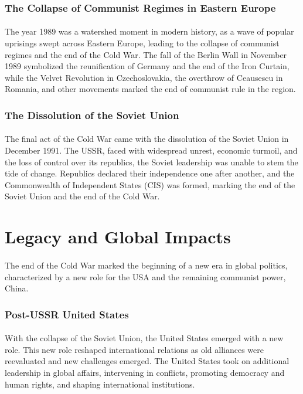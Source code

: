 \documentclass{book}
\begin{document}
\subsubsection*{The Collapse of Communist Regimes in Eastern Europe}
\paragraph{}
The year 1989 was a watershed moment in modern history, as a wave of popular uprisings swept across Eastern Europe, leading to the collapse of communist regimes and the end of the Cold War. The fall of the Berlin Wall in November 1989 symbolized the reunification of Germany and the end of the Iron Curtain, while the Velvet Revolution in Czechoslovakia, the overthrow of Ceausescu in Romania, and other movements marked the end of communist rule in the region. 

\subsubsection*{The Dissolution of the Soviet Union}
\paragraph{}
The final act of the Cold War came with the dissolution of the Soviet Union in December 1991. The USSR, faced with widespread unrest, economic turmoil, and the loss of control over its republics, the Soviet leadership was unable to stem the tide of change. Republics declared their independence one after another, and the Commonwealth of Independent States (CIS) was formed, marking the end of the Soviet Union and the end of the Cold War. 

\section*{Legacy and Global Impacts}
\paragraph{}
The end of the Cold War marked the beginning of a new era in global politics, characterized by a new role for the USA and the remaining communist power, China. 

\subsubsection*{Post-USSR United States}
\paragraph{}
With the collapse of the Soviet Union, the United States emerged with a new role. This new role reshaped international relations as old alliances were reevaluated and new challenges emerged. The United States took on additional leadership in global affairs, intervening in conflicts, promoting democracy and human rights, and shaping international institutions. 
\end{document}
